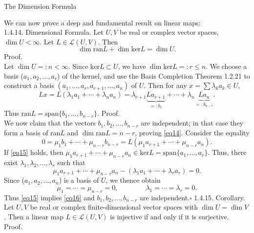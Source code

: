 \documentclass[smaller,hyperref={CJKbookmarks=true}]{beamer}
\newcommand{\myseries}[2]{$#1_1,#1_2,\dots,#1_#2$}
\begin{document}
\begin{frame}{The Dimension Formula}
\begin{spacing}{1}
We can now prove a deep and fundamental result on linear maps:\\
\alert{1.4.14. Dimensional Formula.} Let $U,V$ be real or complex vector spaces, $\dim U<\infty$. Let $L\in\mathcal{L}(U,V)$. Then
\begin{equation}\label{eq14}
  \dim\text{ran}L+\dim\text{ker}L=\dim U.
\end{equation}
\alert{Proof.}\\
Let $\dim U=:n<\infty$. Since $\text{ker}L\subset U$, we have $\dim\text{ker}L=:r\leq n$. We choose a basis (\myseries{a}{r}) of the kernel, and use the Basis Completion Theorem 1.2.21 to construct a basis $(a_1,\ldots,a_r,a_{r+1},\ldots,a_n)$ of $U$. Then for any $x=\sum\lambda_ka_k\in U$,
\[Lx=L(\lambda_1a_1+\cdots+\lambda_na_n)=\lambda_{r+1}\underbrace{La_{r+1}}_{=:b_1}+\cdots+\lambda_n\underbrace{La_n}_{=:b_{n-r}}.\]
Thus $\text{ran}L=\text{span}\{b_1,\ldots,b_{n-r}\}$.
\newpage
\alert{Proof.}\\
We now claim that the vectors \myseries{b}{{n-r}} are independent; in that case they form a basis of $\text{ran}L$ and $\dim\text{ran}L=n-r$, proving \eqref{eq14}. Consider the equality
\begin{equation}\label{eq15}
  0=\mu_1b_1+\cdots+\mu_{n-r}b_{n-r}=L(\mu_1a_{r+1}+\cdots+\mu_{n-r}a_n).
\end{equation}
If \eqref{eq15} holds, then $\mu_1a_{r+1}+\cdots+\mu_{n-r}a_n\in\text{ker}L=\text{span}\{a_1,\ldots,a_r\}.$ Thus, there exist \myseries{\lambda}{r} such that
\[\mu_1a_{r+1}+\cdots+\mu_{n-r}a_n-(\lambda_1a_1+\cdots+\lambda_ra_r)=0.\]
Since (\myseries{a}{n}) is a basis of $U$, we thence obtain
\begin{equation}\label{eq16}
  \mu_1=\cdots=\mu_{n-r}=0,\qquad\qquad\lambda_1=\cdots=\lambda_r=0.
\end{equation}
Thus \eqref{eq15} implies \eqref{eq16} and \myseries{b}{{n-r}} are independent.\qquad\qquad\qquad$\square$
\newpage
\alert{1.4.15. Corollary.} Let $U,V$ be real or complex finite-dimensional vector spaces with $\dim U=\dim V$. Then a linear map $L\in\mathcal{L}(U,V)$ is injective if and only if it is surjective.\\[11pt]
\alert{\large{Proof.}}\\[13pt]
\begin{center}
  \begin{equation*}
    \begin{split}

\end{split}
\end{equation*}
\end{center}
\end{spacing}
\end{frame}
\end{document}
